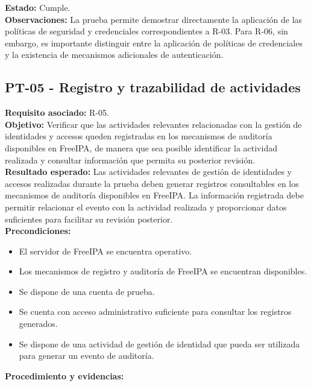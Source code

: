 \textbf{Estado:} Cumple.\\
\textbf{Observaciones:} La prueba permite demostrar directamente la aplicación de las políticas de seguridad y credenciales correspondientes a R-03. Para R-06, sin embargo, es importante distinguir entre la aplicación de políticas de credenciales y la existencia de mecanismos adicionales de autenticación.

\subsection{PT-05 - Registro y trazabilidad de actividades}\label{subsec:pt05}
\textbf{Requisito asociado:} R-05.\\
\textbf{Objetivo:} Verificar que las actividades relevantes relacionadas con la gestión de identidades y accesos queden registradas en los mecanismos de auditoría disponibles en FreeIPA, de manera que sea posible identificar la actividad realizada y consultar información que permita su posterior revisión.\\
\textbf{Resultado esperado:} Las actividades relevantes de gestión de identidades y accesos realizadas durante la prueba deben generar registros consultables en los mecanismos de auditoría disponibles en FreeIPA.
La información registrada debe permitir relacionar el evento con la actividad realizada y proporcionar datos suficientes para facilitar su revisión posterior.\\
\textbf{Precondiciones:}
\begin{itemize}
	\item El servidor de FreeIPA se encuentra operativo.
	\item Los mecanismos de registro y auditoría de FreeIPA se encuentran disponibles.
	\item Se dispone de una cuenta de prueba.
	\item Se cuenta con acceso administrativo suficiente para consultar los registros generados.
	\item Se dispone de una actividad de gestión de identidad que pueda ser utilizada para generar un evento de auditoría.
\end{itemize}
\textbf{Procedimiento y evidencias:}

